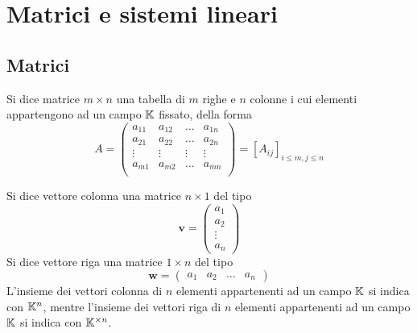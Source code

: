 \chapter{Matrici e sistemi lineari}

\section{Matrici}

\begin{definition}
    Si dice matrice $m \times n$ una tabella di $m$ righe e $n$ colonne i cui elementi appartengono ad un campo $\mathbb{K}$ fissato, della forma
    \begin{equation}
        A = \begin{pmatrix}
            a_{11}  &   a_{12}  & \dots     & a_{1n} \\
            a_{21}  &   a_{22}  & \dots     & a_{2n} \\
            \vdots  &   \vdots  & \vdots    & \vdots \\
            a_{m1}  &   a_{m2}  & \dots     & a_{mn} \\
        \end{pmatrix}
        = [A_{ij}]_{i\leq m, j \leq n}
    \end{equation}
\end{definition}

\begin{definition}
    Si dice vettore colonna una matrice $n \times 1$ del tipo
    \begin{equation}
        \bm{v} = \begin{pmatrix}
            a_{1} \\
            a_{2} \\
            \vdots \\
            a_n
        \end{pmatrix}
    \end{equation}
    Si dice vettore riga una matrice $1 \times n$ del tipo
    \begin{equation}
        \bm{w} = \begin{pmatrix}
            a_{1} & a_2 & \dots & a_n
        \end{pmatrix}
    \end{equation}
    L'insieme dei vettori colonna di $n$ elementi appartenenti ad un campo $\mathbb{K}$ si indica con $\mathbb{K}^n$, mentre l'insieme dei vettori riga di $n$ elementi appartenenti ad un campo $\mathbb{K}$ si indica con $\mathbb{K}^{\times n}$.
\end{definition}

